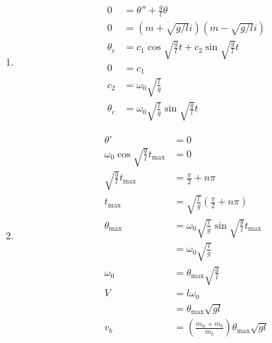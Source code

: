 \documentclass{article}
\begin{document}
\begin{enumerate}
  \item

        \begin{align*}
          0        & = \theta'' + \frac{g}{l} \theta                                 \\
          0        & = (m + \sqrt{g / l} i) (m - \sqrt{g / l} i)                     \\
          \theta_c & = c_1 \cos \sqrt{\frac{g}{l}} t + c_2 \sin \sqrt{\frac{g}{l}} t \\
          0        & = c_1                                                           \\
          c_2      & = \omega_0 \sqrt{\frac{l}{g}}                                   \\
          \theta_c & = \omega_0 \sqrt{\frac{l}{g}} \sin \sqrt{\frac{g}{l}} t
        \end{align*}

  \item

        \begin{align*}
          \theta'                                       & = 0                                                                 \\
          \omega_0 \cos \sqrt{\frac{g}{l}} t_\text{max} & = 0                                                                 \\
          \sqrt{\frac{g}{l}} t_\text{max}               & = \frac{\pi}{2} + n \pi                                             \\
          t_\text{max}                                  & = \sqrt{\frac{l}{g}} \left( \frac{\pi}{2} + n \pi \right)           \\
          \theta_\text{max}                             & = \omega_0 \sqrt{\frac{l}{g}} \sin \sqrt{\frac{g}{l}} t_\text{max}  \\
                                                        & = \omega_0 \sqrt{\frac{l}{g}}                                       \\
          \omega_0                                      & = \theta_\text{max} \sqrt{\frac{g}{l}}                              \\
          V                                             & = l \omega_0                                                        \\
                                                        & = \theta_\text{max} \sqrt{g l}                                      \\
          v_b                                           & = \left( \frac{m_w + m_b}{m_b} \right) \theta_\text{max} \sqrt{g l}
        \end{align*}


\end{enumerate}
\end{document}
